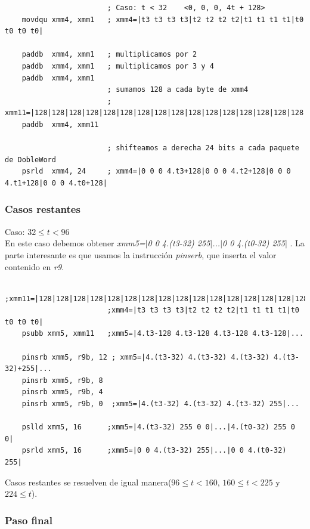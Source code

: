 \begin{codesnippet}
\begin{verbatim}
                        ; Caso: t < 32    <0, 0, 0, 4t + 128>
    movdqu xmm4, xmm1   ; xmm4=|t3 t3 t3 t3|t2 t2 t2 t2|t1 t1 t1 t1|t0 t0 t0 t0|

    paddb  xmm4, xmm1   ; multiplicamos por 2
    paddb  xmm4, xmm1   ; multiplicamos por 3 y 4
    paddb  xmm4, xmm1
                        ; sumamos 128 a cada byte de xmm4
                        ; xmm11=|128|128|128|128|128|128|128|128|128|128|128|128|128|128|128|128|
    paddb  xmm4, xmm11 

                        ; shifteamos a derecha 24 bits a cada paquete de DobleWord
    psrld  xmm4, 24     ; xmm4=|0 0 0 4.t3+128|0 0 0 4.t2+128|0 0 0 4.t1+128|0 0 0 4.t0+128|
\end{verbatim}
\end{codesnippet}

\subsubsection*{Casos restantes}
Caso: $32 \leq t < 96$ \\
En este caso debemos obtener \emph{xmm5=$|$0 0 4.(t3-32) 255$|$...$|$0 0 4.(t0-32) 255$|$ }. 
La parte interesante es que usamos la instrucción \emph{pinserb}, que inserta el valor contenido en \emph{r9}.
\begin{codesnippet}
\begin{verbatim}				
                        ;xmm11=|128|128|128|128|128|128|128|128|128|128|128|128|128|128|128|128|
                        ;xmm4=|t3 t3 t3 t3|t2 t2 t2 t2|t1 t1 t1 t1|t0 t0 t0 t0|
    psubb xmm5, xmm11   ;xmm5=|4.t3-128 4.t3-128 4.t3-128 4.t3-128|...

    pinsrb xmm5, r9b, 12 ; xmm5=|4.(t3-32) 4.(t3-32) 4.(t3-32) 4.(t3-32)+255|...
    pinsrb xmm5, r9b, 8  
    pinsrb xmm5, r9b, 4
    pinsrb xmm5, r9b, 0  ;xmm5=|4.(t3-32) 4.(t3-32) 4.(t3-32) 255|...

    pslld xmm5, 16      ;xmm5=|4.(t3-32) 255 0 0|...|4.(t0-32) 255 0 0|
    psrld xmm5, 16      ;xmm5=|0 0 4.(t3-32) 255|...|0 0 4.(t0-32) 255|                    
\end{verbatim}
\end{codesnippet}

Casos restantes se resuelven de igual manera($96\leq t < 160$, $160\leq t <225$ y  $224 \leq t$).

\subsubsection*{Paso final}

